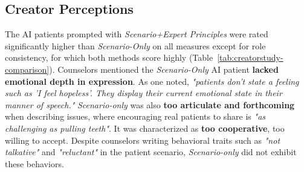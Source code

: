 \documentclass[11pt]{article}
\newcommand{\raj}[1]{\ifthenelse{\boolean{showcomments}}{\textcolor{purple}{[#1 —raj]}}{}}
\begin{document}
\subsection{Creator Perceptions}\label{sec:firstparty}
The AI patients prompted with \textit{Scenario+Expert Principles} were rated significantly higher than \textit{Scenario-Only} on all measures except for role consistency, for which both methods score highly (Table~\ref{tab:creatorstudy-comparison}).
Counselors mentioned the \textit{Scenario-Only} AI patient \textbf{lacked emotional depth in expression}. As one noted, \textit{"patients don't state a feeling such as 'I feel hopeless'. They display their current emotional state in their manner of speech."} \textit{Scenario-only} was also \textbf{too articulate and forthcoming} when describing issues, where encouraging real patients to share is \textit{"as challenging as pulling teeth"}. It was characterized as \textbf{too cooperative}, too willing to accept. Despite counselors writing behavioral traits such as \textit{"not talkative"} and \textit{"reluctant"} in the patient scenario, \textit{Scenario-only} did not exhibit these behaviors.
\end{document}
